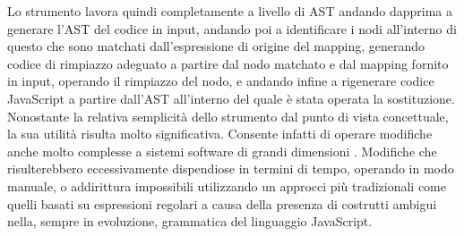 Lo strumento lavora quindi completamente a livello di AST andando dapprima a
generare l’AST del codice in input, andando poi a identificare i nodi
all’interno di questo che sono matchati dall’espressione di origine del mapping,
generando codice di rimpiazzo adeguato a partire dal nodo matchato e dal mapping
fornito in input, operando il rimpiazzo del nodo, e andando infine a rigenerare
codice JavaScript a partire dall’AST all’interno del quale è stata operata la
sostituzione.\\

Nonostante la relativa semplicità dello strumento dal punto di vista
concettuale, la sua utilità risulta molto significativa. Consente infatti di
operare modifiche anche molto complesse a sistemi software di grandi dimensioni
\cite{jsconf2016}. Modifiche che risulterebbero eccessivamente dispendiose in
termini di tempo, operando in modo manuale, o addirittura impossibili
utilizzando un approcci più tradizionali come quelli basati su espressioni
regolari a causa della presenza di costrutti ambigui nella, sempre in
evoluzione, grammatica del linguaggio JavaScript.\\
